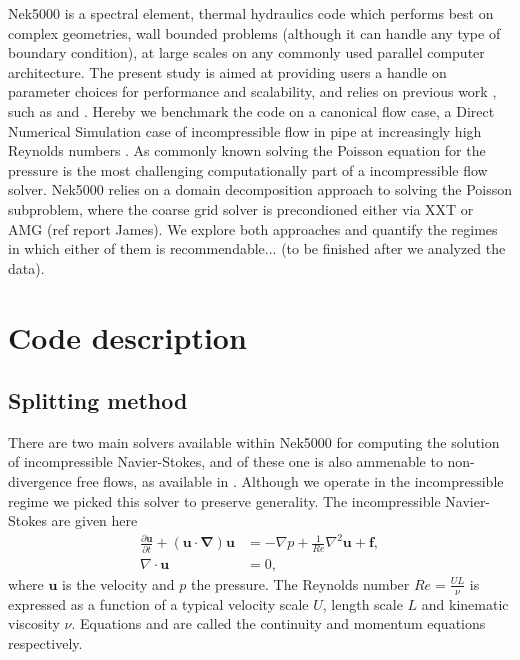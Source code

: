 \documentclass{sig-alternate}
\begin{document}
Nek5000 is a spectral element, thermal hydraulics code which performs best on complex geometries, wall bounded problems (although it can handle any type of boundary condition), at large scales on any commonly used parallel computer architecture. The present study is aimed at providing users a handle on parameter choices for performance and scalability, and relies on previous work , such as \cite{fischer:scaling} and \cite{tufo:terascale}. Hereby we benchmark the code on a canonical flow case, a Direct Numerical Simulation case of incompressible flow in pipe at increasingly high Reynolds numbers \cite{Khoury2013}. As commonly known solving the Poisson equation for the pressure is the most challenging computationally part of a incompressible flow solver. Nek5000 relies on a domain decomposition approach to solving the Poisson subproblem, where the coarse grid solver is precondioned either via XXT \cite{Tufo2001151} or AMG (ref report James). We explore both approaches and quantify the regimes in which either of them is recommendable... (to be finished after we analyzed the data).

\section{Code description}

\subsection{Splitting method}
There are two main solvers available within Nek5000 for computing the solution of incompressible Navier-Stokes, and of these one is also ammenable to non-divergence free flows, as available in \cite{Tomboulides1997}. Although we operate in the incompressible regime we picked this solver to preserve generality. The incompressible Navier-Stokes are given here
\begin{align} 
 \frac{\partial \mathbf{u}}{\partial t} + (\mathbf{u \cdot \nabla}) \mathbf{u} & = - \nabla p + \frac{1}{Re} \nabla^2 \mathbf{u} + \mathbf{f} \label{eqn:NS_momentum},\\
 \nabla \cdot \mathbf{u} & = 0, \label{eqn:NS_continuity}
\end{align}
where $\mathbf{u}$ is the velocity and $p$ the pressure. The Reynolds number $Re = \frac{U L}{\nu}$ is expressed as a function of a typical velocity scale $U$, length scale $L$ and kinematic viscosity $\nu$. Equations   and  are called the continuity and momentum equations respectively. 
\end{document}
